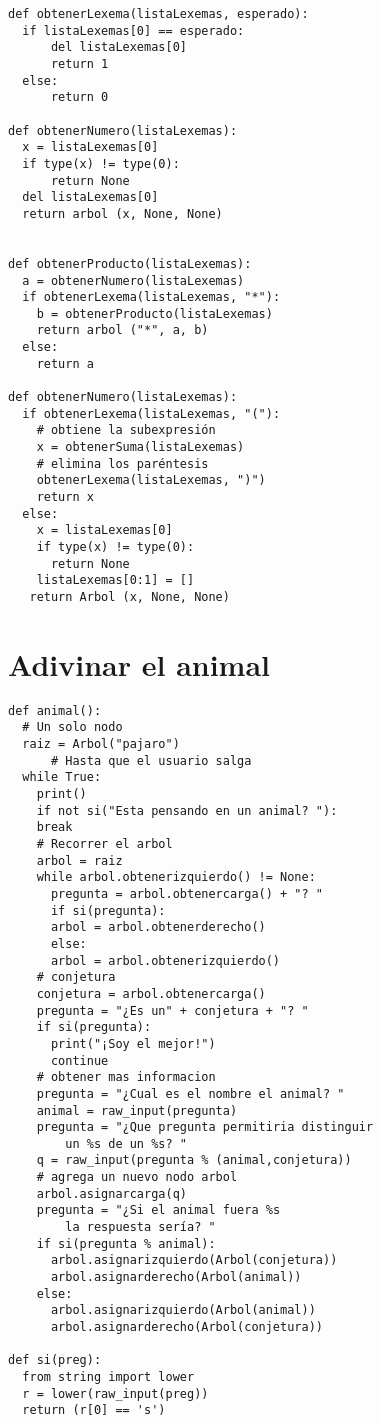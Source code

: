 \begin{verbatim}
def obtenerLexema(listaLexemas, esperado):
  if listaLexemas[0] == esperado:
      del listaLexemas[0]
      return 1
  else:
      return 0

def obtenerNumero(listaLexemas):
  x = listaLexemas[0]
  if type(x) != type(0):
      return None
  del listaLexemas[0]
  return arbol (x, None, None)


def obtenerProducto(listaLexemas):
  a = obtenerNumero(listaLexemas)
  if obtenerLexema(listaLexemas, "*"):
    b = obtenerProducto(listaLexemas) 
    return arbol ("*", a, b)
  else:
    return a

def obtenerNumero(listaLexemas):
  if obtenerLexema(listaLexemas, "("):
    # obtiene la subexpresión
    x = obtenerSuma(listaLexemas) 
    # elimina los paréntesis
    obtenerLexema(listaLexemas, ")") 
    return x
  else:
    x = listaLexemas[0]
    if type(x) != type(0):
      return None
    listaLexemas[0:1] = []
   return Arbol (x, None, None)  
\end{verbatim}

\section{Adivinar el animal}

\begin{verbatim}
def animal():
  # Un solo nodo
  raiz = Arbol("pajaro")
      # Hasta que el usuario salga
  while True:
    print()
    if not si("Esta pensando en un animal? "):
	break
    # Recorrer el arbol
    arbol = raiz
    while arbol.obtenerizquierdo() != None:
      pregunta = arbol.obtenercarga() + "? "
      if si(pregunta):
	  arbol = arbol.obtenerderecho()
      else:
	  arbol = arbol.obtenerizquierdo()
    # conjetura
    conjetura = arbol.obtenercarga()
    pregunta = "¿Es un" + conjetura + "? "
    if si(pregunta):
      print("¡Soy el mejor!")
      continue
    # obtener mas informacion
    pregunta = "¿Cual es el nombre el animal? "
    animal = raw_input(pregunta)
    pregunta = "¿Que pregunta permitiria distinguir 
		un %s de un %s? "
    q = raw_input(pregunta % (animal,conjetura))
    # agrega un nuevo nodo arbol
    arbol.asignarcarga(q)
    pregunta = "¿Si el animal fuera %s 
		la respuesta sería? "
    if si(pregunta % animal):
      arbol.asignarizquierdo(Arbol(conjetura))
      arbol.asignarderecho(Arbol(animal))
    else:
      arbol.asignarizquierdo(Arbol(animal))
      arbol.asignarderecho(Arbol(conjetura))

def si(preg):
  from string import lower
  r = lower(raw_input(preg))
  return (r[0] == 's')
\end{verbatim}

